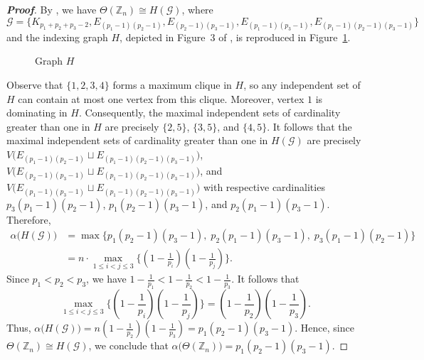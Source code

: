 \documentclass{amsart}
\theoremstyle{plain}
\theoremstyle{definition}
\begin{document}
\begin{proof}[\textbf{Proof}]
By \cite[Proposition~3.5]{shubh-arxiv25}, we have $\Theta(\mathbb{Z}_{n})\cong H(\mathcal{G})$, where 
\[\mathcal{G} = \bigl\{K_{p_1+p_2+p_3-2}, E_{(p_1-1)(p_2-1)}, E_{(p_2-1)(p_3-1)}, E_{(p_1-1)(p_3-1)}, E_{(p_1-1)(p_2-1)(p_3-1)}\bigr\}\] and the indexing graph $H$, depicted in Figure~3 of \cite{shubh-arxiv25}, is reproduced in Figure~\ref{graph-H-of-cyclic-pqr}.  

	\begin{figure}[h]
	\vspace{-3mm}
	\caption{Graph $H$}	\label{graph-H-of-cyclic-pqr}
\end{figure}
Observe that $\{1,2,3,4\}$ forms a maximum clique in $H$, so any independent set of $H$ can contain at most one vertex from this clique. Moreover, vertex $1$ is dominating in $H$. Consequently, the maximal independent sets of cardinality greater than one in $H$ are  precisely $\{2,5\}$, $\{3,5\}$, and $\{4,5\}$. It follows that the maximal independent sets of cardinality greater than one in  $H(\mathcal{G})$ are precisely $V\bigl(E_{(p_1-1)(p_2-1)} \sqcup E_{(p_1-1)(p_2-1)(p_3-1)}\bigr)$,
$V\bigl(E_{(p_2-1)(p_3-1)}\sqcup E_{(p_1-1)(p_2-1)(p_3-1)}\bigr)$, and $V\bigl(E_{(p_1-1)(p_3-1)}\sqcup E_{(p_1-1)(p_2-1)(p_3-1)}\bigr)$ with respective cardinalities $p_3(p_1-1)(p_2-1)$, $p_1(p_2-1)(p_3-1)$, and $p_2(p_1-1)(p_3-1)$.
Therefore,
\begin{align*}
	\alpha\bigl(H(\mathcal{G})\bigr)
	&=\max\bigl\{p_1(p_2-1)(p_3-1),\; p_2(p_1-1)(p_3-1),\; p_3(p_1-1)(p_2-1)\bigr\}\\
	&= n\cdot\max_{1\leq i < j \leq 3}\biggl\{\left(1- \frac{1}{p_i}\right)\left(1- \frac{1}{p_j}\right) \biggr\}.
\end{align*}
Since $p_1 < p_2 < p_3$, we have $1-\frac{1}{p_1} <  1-\frac{1}{p_2} <1-\frac{1}{p_3}$. It follows that
\[\max_{1\leq i < j \leq 3}\biggl\{\left(1- \frac{1}{p_i}\right)\left(1- \frac{1}{p_j}\right)\biggr\} =  \left(1- \frac{1}{p_{2}}\right) \left(1- \frac{1}{p_3}\right).\]
Thus, $\alpha\bigl(H(\mathcal{G})\bigr) = n \left(1- \frac{1}{p_{2}}\right) \left(1- \frac{1}{p_3}\right)
= p_1(p_2-1)(p_3-1)$. Hence, since $\Theta(\mathbb{Z}_{n})\cong H(\mathcal{G})$, we conclude that $\alpha\bigl(\Theta(\mathbb{Z}_{n})\bigr)= p_1(p_2-1)(p_3-1)$.
\end{proof}
\end{document}

